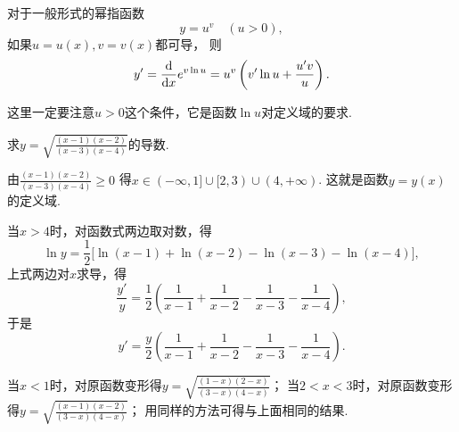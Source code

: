 \begin{theorem}
对于一般形式的幂指函数\begin{equation*}
	y = u^v
	\quad(u > 0),
\end{equation*}
如果\(u=u(x),v=v(x)\)都可导，
则\begin{equation}
	y' = \dv{x} e^{v \ln u}
	= u^v \left( v' \ln u + \frac{u'v}{u} \right).
\end{equation}
\end{theorem}
这里一定要注意\(u>0\)这个条件，它是函数\(\ln u\)对定义域的要求.

\begin{example}
求\(y=\sqrt{\frac{(x-1)(x-2)}{(x-3)(x-4)}}\)的导数.
\begin{solution}
由\(\frac{(x-1)(x-2)}{(x-3)(x-4)}\geq0\)
得\(x \in (-\infty,1]\cup[2,3)\cup(4,+\infty)\).
这就是函数\(y=y(x)\)的定义域.

当\(x>4\)时，对函数式两边取对数，得\begin{equation*}
	\ln y = \frac{1}{2} \bigl[
		\ln(x-1)+\ln(x-2)-\ln(x-3)-\ln(x-4)
	\bigr],
\end{equation*}
上式两边对\(x\)求导，得\begin{equation*}
	\frac{y'}{y} = \frac{1}{2} \left(
		\frac{1}{x-1} + \frac{1}{x-2} - \frac{1}{x-3} - \frac{1}{x-4}
	\right),
\end{equation*}
于是\begin{equation*}
	y' = \frac{y}{2} \left(
		\frac{1}{x-1} + \frac{1}{x-2} - \frac{1}{x-3} - \frac{1}{x-4}
	\right).
\end{equation*}

当\(x<1\)时，对原函数变形得\(y=\sqrt{\frac{(1-x)(2-x)}{(3-x)(4-x)}}\)；
当\(2<x<3\)时，对原函数变形得\(y=\sqrt{\frac{(x-1)(x-2)}{(3-x)(4-x)}}\)；
用同样的方法可得与上面相同的结果.
\end{solution}
\end{example}


